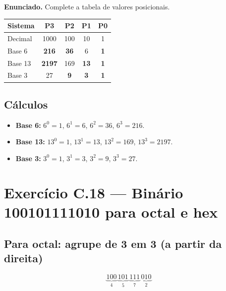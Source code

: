 \documentclass[11pt,a4paper]{article}
\begin{document}
\begin{enunciado}
\textbf{Enunciado.} Complete a tabela de valores posicionais.
\end{enunciado}

\begin{resposta}
\begin{center}
\renewcommand{\arraystretch}{1.3}
\begin{tabular}{|l|c|c|c|c|}
\hline
\textbf{Sistema} & \textbf{P3} & \textbf{P2} & \textbf{P1} & \textbf{P0} \\
\hline
Decimal & 1000 & 100 & 10 & 1 \\
Base 6  & \textbf{216} & \textbf{36}  & 6  & \textbf{1} \\
Base 13 & \textbf{2197} & 169 & \textbf{13} & \textbf{1} \\
Base 3  & 27   & \textbf{9}   & \textbf{3}  & \textbf{1} \\
\hline
\end{tabular}
\end{center}
\end{resposta}

\subsection*{C\'alculos}

\begin{itemize}[leftmargin=*,itemsep=0pt]
  \item \textbf{Base 6:} $6^0=1$, $6^1=6$, $6^2=36$, $6^3=216$.
  \item \textbf{Base 13:} $13^0=1$, $13^1=13$, $13^2=169$, $13^3=2197$.
  \item \textbf{Base 3:} $3^0=1$, $3^1=3$, $3^2=9$, $3^3=27$.
\end{itemize}

\section{Exerc\'icio C.18 --- Bin\'ario 100101111010 para octal e hex}

\subsection*{Para octal: agrupe de 3 em 3 (a partir da direita)}

\[
\underbrace{100}_{4} \, \underbrace{101}_{5} \, \underbrace{111}_{7} \, \underbrace{010}_{2}
\]
\end{document}
